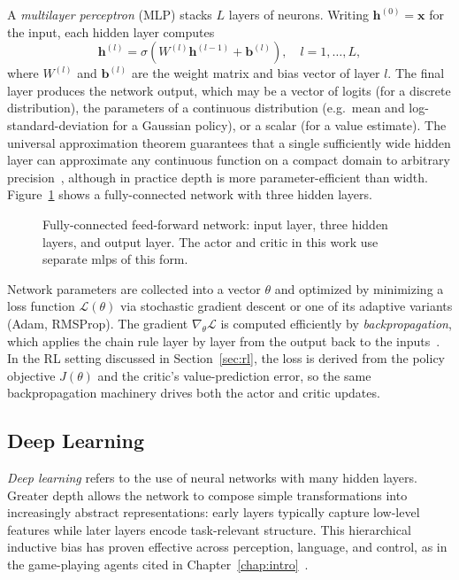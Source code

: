A \emph{multilayer perceptron} (MLP) stacks $L$ layers of neurons.  Writing
$\mathbf{h}^{(0)} = \mathbf{x}$ for the input, each hidden layer computes
%
\begin{equation}
    \mathbf{h}^{(l)} = \sigma\!\left(W^{(l)}\mathbf{h}^{(l-1)} + \mathbf{b}^{(l)}\right),
    \quad l = 1, \ldots, L,
\end{equation}
%
where $W^{(l)}$ and $\mathbf{b}^{(l)}$ are the weight matrix and bias vector
of layer $l$.  The final layer produces the network output, which may be a
vector of logits (for a discrete distribution), the parameters of a
continuous distribution (e.g.\ mean and log-standard-deviation for a Gaussian
policy), or a scalar (for a value estimate).  The universal approximation
theorem guarantees that a single sufficiently wide hidden layer can approximate
any continuous function on a compact domain to arbitrary precision~\cite{goodfellow2016deep},
although in practice depth is more parameter-efficient than width.
Figure~\ref{fig:mlp} shows a fully-connected network with three
hidden layers.

\begin{figure}[ht]
    \centering
    \resizebox{0.88\linewidth}{!}{%
    }
    \caption{Fully-connected feed-forward network: input layer, three hidden
    layers, and output layer.  The actor and critic in this work use separate
    \glspl{mlp} of this form.}
    \label{fig:mlp}
\end{figure}

Network parameters are collected into a vector $\theta$ and optimized by
minimizing a loss function $\mathcal{L}(\theta)$ via stochastic gradient
descent or one of its adaptive variants (Adam, RMSProp).  The gradient
$\nabla_\theta \mathcal{L}$ is computed efficiently by
\emph{backpropagation}, which applies the chain rule layer by layer from the
output back to the inputs~\cite{goodfellow2016deep}.  In the RL setting
discussed in Section~\ref{sec:rl}, the loss is derived from the policy
objective $J(\theta)$ and the critic's value-prediction error, so the same
backpropagation machinery drives both the actor and critic updates.

\subsection{Deep Learning}

\emph{Deep learning} refers to the use of neural networks with many hidden
layers.  Greater depth allows the network to compose simple transformations
into increasingly abstract representations: early layers typically capture
low-level features while later layers encode task-relevant structure.  This
hierarchical inductive bias has proven effective across perception, language,
and control, as in the game-playing agents cited in Chapter~\ref{chap:intro}~\cite{silver2016mastering,berner2019dota}.

